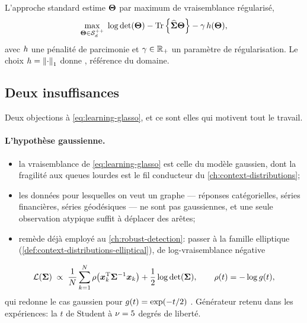 L'approche standard estime $\boldsymbol{\Theta}$ par maximum de vraisemblance
régularisé,
\begin{equation}
  \max_{\boldsymbol{\Theta}\in\mathcal{S}_{d}^{++}}
  \;
  \log\operatorname{\operatorname{det}}(\boldsymbol{\Theta})-\operatorname{\operatorname{Tr}}\left\{\widehat{\boldsymbol{\Sigma}}\boldsymbol{\Theta}\right\}-\gamma\,h(\boldsymbol{\Theta}),
  \label{eq:learning-glasso}
\end{equation}
avec $h$ une pénalité de parcimonie et $\gamma\in\mathbb{R}_+$ un paramètre de
régularisation. Le choix $h=\left\lVert\cdot\right\rVert_1$ donne 
, référence du domaine.

\subsection{Deux insuffisances}
\label{subsec:learning-insuffisances}

Deux objections à \cref{eq:learning-glasso}, et ce sont elles qui motivent tout
le travail.

\paragraph{L'hypothèse gaussienne.}
\begin{itemize}
  \item la vraisemblance de \cref{eq:learning-glasso} est celle du modèle
    gaussien, dont la fragilité aux queues lourdes est le fil conducteur du
    \cref{ch:context-distributions};
  \item les données pour lesquelles on veut un graphe --- réponses
    catégorielles, séries financières, séries géodésiques --- ne sont pas
    gaussiennes, et une seule observation atypique suffit à déplacer des
    arêtes;
  \item remède déjà employé au \cref{ch:robust-detection}: passer à la famille
    elliptique (\cref{def:context-distributions-elliptical}), de
    log-vraisemblance négative
\end{itemize}
\begin{equation}
  \mathcal{L}(\boldsymbol{\Sigma})
  \;\propto\;
  \frac{1}{N}\sum_{k=1}^{N}
  \rho\!\left(\boldsymbol{x}_k^{\mathrm{T}}{\boldsymbol{\Sigma}}^{-1}\boldsymbol{x}_k\right)
  +\frac{1}{2}\log\operatorname{\operatorname{det}}(\boldsymbol{\Sigma}),
  \qquad
  \rho(t)=-\log g(t),
  \label{eq:learning-nll-elliptique}
\end{equation}
qui redonne le cas gaussien pour $g(t)=\exp(-t/2)$
. Générateur retenu dans les expériences: la
$t$ de Student à $\nu=5$ degrés de liberté.

